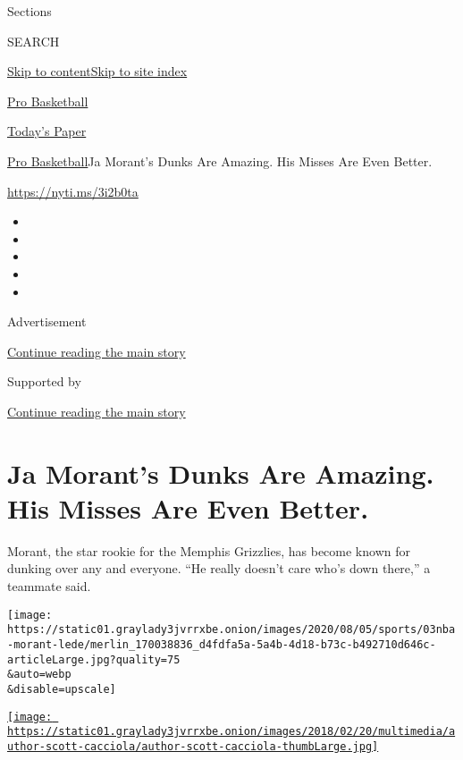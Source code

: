Sections

SEARCH

\protect\hyperlink{site-content}{Skip to
content}\protect\hyperlink{site-index}{Skip to site index}

\href{https://www.nytimes3xbfgragh.onion/section/sports/basketball}{Pro
Basketball}

\href{https://myaccount.nytimes3xbfgragh.onion/auth/login?response_type=cookie\&client_id=vi}{}

\href{https://www.nytimes3xbfgragh.onion/section/todayspaper}{Today's
Paper}

\href{/section/sports/basketball}{Pro Basketball}\textbar{}Ja Morant's
Dunks Are Amazing. His Misses Are Even Better.

\url{https://nyti.ms/3i2b0ta}

\begin{itemize}
\item
\item
\item
\item
\item
\end{itemize}

Advertisement

\protect\hyperlink{after-top}{Continue reading the main story}

Supported by

\protect\hyperlink{after-sponsor}{Continue reading the main story}

\hypertarget{ja-morants-dunks-are-amazing-his-misses-are-even-better}{%
\section{Ja Morant's Dunks Are Amazing. His Misses Are Even
Better.}\label{ja-morants-dunks-are-amazing-his-misses-are-even-better}}

Morant, the star rookie for the Memphis Grizzlies, has become known for
dunking over any and everyone. ``He really doesn't care who's down
there,'' a teammate said.

\texttt{[image: https://static01.graylady3jvrrxbe.onion/images/2020/08/05/sports/03nba-morant-lede/merlin\_170038836\_d4fdfa5a-5a4b-4d18-b73c-b492710d646c-articleLarge.jpg?quality=75\\\&auto=webp\\\&disable=upscale]}

\href{https://www.nytimes3xbfgragh.onion/by/scott-cacciola}{\texttt{[image: https://static01.graylady3jvrrxbe.onion/images/2018/02/20/multimedia/author-scott-cacciola/author-scott-cacciola-thumbLarge.jpg]}}

